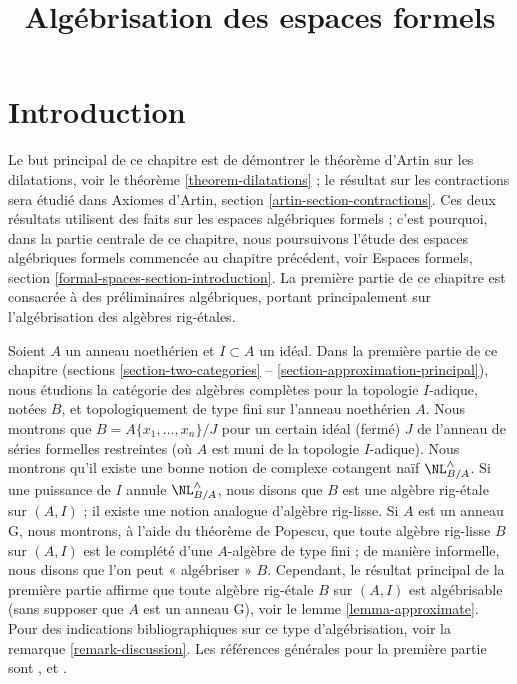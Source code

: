 

%


\title{Algébrisation des espaces formels}


\maketitle

\label{section-phantom}

\tableofcontents

\section{Introduction}
\label{section-introduction}

\noindent
Le but principal de ce chapitre est de démontrer le théorème d'Artin sur les
dilatations, voir le théorème \ref{theorem-dilatations} ; le résultat sur les
contractions sera étudié dans Axiomes d'Artin, section
\ref{artin-section-contractions}. Ces deux résultats utilisent des faits sur
les espaces algébriques formels ; c'est pourquoi, dans la partie centrale de
ce chapitre, nous poursuivons l'étude des espaces algébriques formels commencée
au chapitre précédent, voir Espaces formels, section
\ref{formal-spaces-section-introduction}. La première partie de ce chapitre est
consacrée à des préliminaires algébriques, portant principalement sur
l'algébrisation des algèbres rig-étales.

\medskip\noindent
Soient $A$ un anneau noethérien et $I \subset A$ un idéal. Dans la
première partie de ce chapitre (sections \ref{section-two-categories}
-- \ref{section-approximation-principal}), nous étudions la catégorie des
algèbres complètes pour la topologie $I$-adique, notées $B$, et
topologiquement de type fini sur l'anneau noethérien $A$. Nous montrons que
$B = A\{x_1, \ldots, x_n\}/J$ pour un certain idéal (fermé) $J$ de
l'anneau de séries formelles restreintes (où $A$ est muni de la topologie
$I$-adique). Nous montrons qu'il existe une bonne notion de complexe cotangent
naïf $\NL_{B/A}^\wedge$. Si une puissance de $I$ annule
$\NL_{B/A}^\wedge$, nous disons que $B$ est une algèbre rig-étale sur
$(A, I)$ ; il existe une notion analogue d'algèbre rig-lisse. Si $A$ est un
anneau G, nous montrons, à l'aide du théorème de Popescu, que toute algèbre
rig-lisse $B$ sur $(A, I)$ est le complété d'une $A$-algèbre de type fini ;
de manière informelle, nous disons que l'on peut « algébriser » $B$.
Cependant, le résultat principal de la première partie affirme que toute
algèbre rig-étale $B$ sur $(A, I)$ est algébrisable (sans supposer que $A$ est
un anneau G), voir le lemme \ref{lemma-approximate}. Pour des indications
bibliographiques sur ce type d'algébrisation, voir la remarque
\ref{remark-discussion}. Les références générales pour la première partie sont
\cite{EGA}, \cite{Abbes} et \cite{Fujiwara-Kato}.

